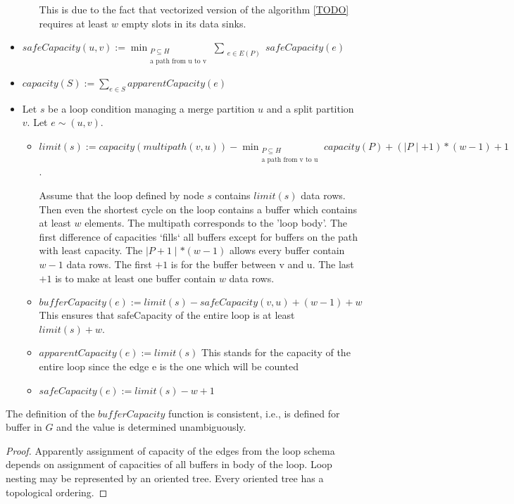 \begin{define}
\begin{itemize}
\begin{itemize}
        This is due to the fact that vectorized version of the algorithm \ref{TODO} requires at least $w$ empty slots in its data sinks.
    \end{itemize}
    \item $safeCapacity(u, v) := \min_{\substack{P \subseteq H\\ \text{a path from u to v}}} \sum_{\substack{e \in E(P)}} safeCapacity(e) $ 
    \item $capacity(S) := \sum_{e \in S} apparentCapacity(e) $ 
    \item Let $s$ be a loop condition managing a merge partition $u$ and a split partition $v$. Let $e \sim (u,v)$.
    \begin{itemize}
      \item $limit(s) := capacity(multipath(v,u)) - \min_{\substack{P \subseteq H\\ \text{a path from v to u}}} capacity(P) + (\mid P \mid + 1) * (w-1) + 1$. 

        Assume that the loop defined by node $s$ contains $limit(s)$ data rows. Then even the shortest cycle on the loop contains a buffer which contains at least $w$ elements. The multipath corresponds to the 'loop body'. The first difference of capacities `fills` all buffers except for buffers on the path with least capacity. The $\mid P +1 \mid * (w-1)$  allows every buffer contain $w-1$ data rows. The first $+1$ is for the buffer between v and u. The last $+1$ is to make at least one buffer contain $w$ data rows.

      \item $bufferCapacity(e) := limit(s) - safeCapacity(v,u) + (w-1) + w$ This ensures that safeCapacity of the entire loop is at least $limit(s) + w$. 
      \item $apparentCapacity(e) := limit(s)$ This stands for the capacity of the entire loop since the edge e is the one which will be counted
      \item $safeCapacity(e) := limit(s) - w + 1$
    \end{itemize}
  \end{itemize}
\end{define}

\begin{claim}
The definition of the $bufferCapacity$ function is consistent, i.e., is defined for buffer in $G$ and the value is determined unambiguously.
  \begin{proof}
    Apparently assignment of capacity of the edges from the loop schema depends on assignment of capacities of all buffers in body of the loop. Loop nesting may be represented by an oriented tree. Every oriented tree has a topological ordering. 
  \end{proof}
\end{claim}


